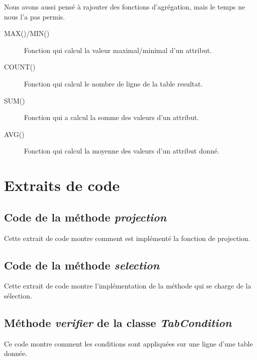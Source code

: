 \documentclass[oneside,13pt,a4paper]{report}
\begin{document}
Nous avons aussi pensé à rajouter des fonctions d'agrégation, mais le temps ne nous l'a pas permis.

\begin{description}
	\item[MAX()/MIN()] Fonction qui calcul la valeur maximal/minimal d'un attribut.
	\item[COUNT()] Fonction qui calcul le nombre de ligne de la table resultat.
	\item[SUM()] Fonction qui a calcul la somme des valeurs d'un attribut.
	\item[AVG()] Fonction qui calcul la moyenne des valeurs d'un attribut donné.
\end{description}


\appendix

\chapter{Extraits de code}

\section{Code de la méthode \textit{projection}}

Cette extrait de code montre comment est implémenté la fonction de projection.



\section{Code de la méthode \textit{selection}}

Cette extrait de code montre l'implémentation de la méthode qui se charge de la sélection.



\section{Méthode \textit{verifier} de la classe \textit{TabCondition}}

Ce code montre comment les conditions sont appliquées sur une ligne d'une table donnée.


\end{document}
